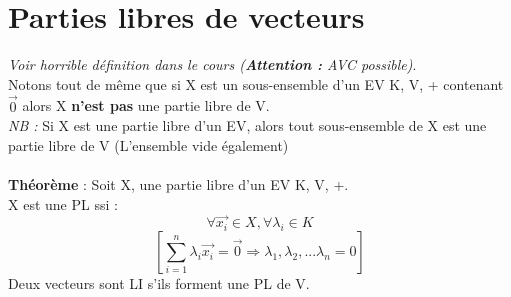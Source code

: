 \documentclass[11pt, a4paper, openany]{book}
\begin{document}
	\section{Parties libres de vecteurs}
	\textit{Voir horrible définition dans le cours (\textbf{Attention :} AVC possible)}.\\
	Notons tout de même que si X est un sous-ensemble d'un EV K, V, + contenant $\vec{0}$ alors X \textbf{n'est pas} une partie libre de V.\\
	\textit{NB :} Si X est une partie libre d'un EV, alors tout sous-ensemble de X est une partie libre de V (L'ensemble vide également)\\\\
	\textbf{Théorème } : Soit X, une partie libre d'un EV K, V, +.\\
	X est une PL ssi :
	$$\forall \vec{x_{i}} \in X, \forall \lambda_{i} \in K$$
	$$[\sum_{i=1}^{n} \lambda_{i}\vec{x_{i}} = \vec{0} \Rightarrow \lambda_{1}, \lambda_{2}, ... \lambda_{n} = 0]$$
	Deux vecteurs sont LI s'ils forment une PL de V.
	
\end{document}
